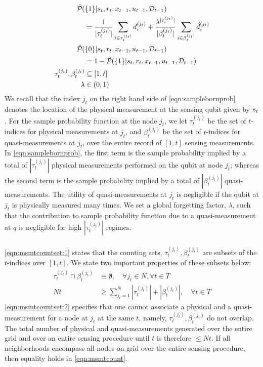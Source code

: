 \begin{align}
\hat{\mathcal{P}}_{} (&\{1\} | s_{ t}, r_{ t}, x_{t-1}, u_{t-1}, \mathcal{D}_{t-1}) \nonumber \\ 
&=  \frac{1}{|\tau^{(j_t)}_t|}\sum_{i \in \tau^{(j_t)}_t} d^{( j_t )}_{i} + \frac{\lambda^{|\tau^{(j_t)}_t|}}{|\beta^{(j_t)}_t|}\sum_{i \in \beta^{(j_t)}_t } \hat{d}^{( j_t )}_{i}  \label{eqn:samplebornprob} \\ 
\hat{\mathcal{P}}_{} (&\{0\} | s_{ t}, r_{ t}, x_{t-1}, u_{t-1}, \mathcal{D}_{t-1}) \nonumber \\
&= 1 - \hat{\mathcal{P}}_{} (\{1\} | s_{ t}, r_{ t}, x_{t-1}, u_{t-1}, \mathcal{D}_{t-1}) \\
\tau^{(j_t)}_t , \beta^{(j_t)}_t & \subseteq [1, t] \label{eqn:msmtcountset:1}  \\
\lambda & \in (0,1) \label{eqn:forgettingfactor} 
\end{align} We recall that the index $j_t$  on the right hand side of \cref{eqn:samplebornprob} denotes the location of the physical measurement at the sensing qubit given by $s_{ t}$. For the sample probability function at the node $j_t$, we let $\tau^{(j_t)}_t $ be the set of $t$-indices for physical measurements at $j_t$, and $ \beta^{(j_t)}_t $ be the set of $t$-indices for quasi-measurements at $j_t$, over the entire record of $[1, t]$ sensing measurements. In \cref{eqn:samplebornprob}, the first term is the sample probability  implied by a total of $|\tau^{(j_t)}_t|$ physical measurements performed on the qubit at node $j_t$; whereas the second term is the sample probability  implied by a total of $|\beta^{(j_t)}_t|$ quasi-measurements. The utility of quasi-measurements at $j_t$ is negligible if the qubit at $j_t$ is physically measured many times. We set a global forgetting factor, $\lambda$, such that the contribution to sample probability function due to a quasi-measurement at $q$ is negligible for high $|\tau^{(j_t)}_t|$ regimes. \\
\\
\cref{eqn:msmtcountset:1} states that the counting sets, $\tau^{(j_t)}_t, \beta^{(j_t)}_t$ are subsets of the $t$-indices over $[1,t]$. We state two important properties of these subsets below:
\begin{align}
\tau^{(j_t)}_t \cap \beta^{(j_t)}_t & \equiv \emptyset , \quad\forall j_t \in N, \forall t \in T \label{eqn:msmtcountset:2} \\
Nt & \geq \sum_{j_t=1}^{N} |\tau^{(j_t)}_t| + |\beta^{(j_t)}_t| , \quad \forall t \in T \label{eqn:msmtcount} 
\end{align} \cref{eqn:msmtcountset:2}  specifies that one cannot associate a physical and a quasi-measurement for a node at $j_t$ at the same $t$, namely,  $\tau^{(j_t)}_t, \beta^{(j_t)}_t$ do not overlap. The total number of physical and quasi-measurements generated over the entire grid and over an entire sensing procedure until $t$ is therefore $\leq Nt$. If all neighborhoods encompass all nodes on grid over the entire sensing procedure, then equality holds in \cref{eqn:msmtcount}. \\

